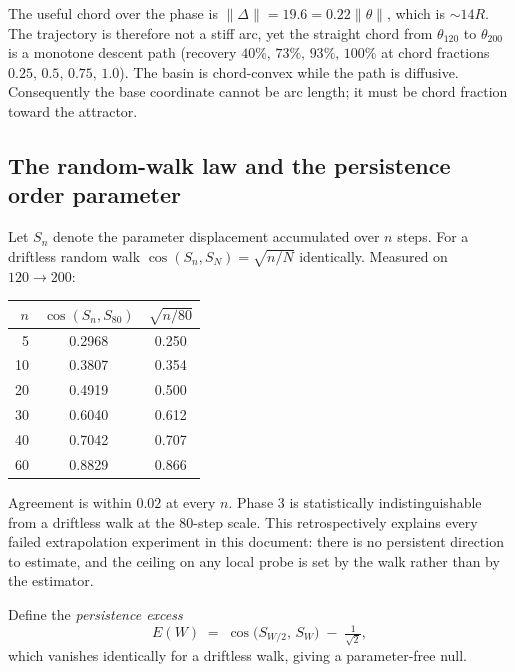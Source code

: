 \begin{observation}
The useful chord over the phase is $\|\Delta\| = 19.6 = 0.22\|\theta\|$,
which is $\sim 14 R$. The trajectory is therefore not a stiff arc, yet the
straight chord from $\theta_{120}$ to $\theta_{200}$ is a monotone descent
path (recovery $40\%,\,73\%,\,93\%,\,100\%$ at chord fractions
$0.25,\,0.5,\,0.75,\,1.0$). The basin is chord-convex while the path is
diffusive. Consequently the base coordinate cannot be arc length; it must be
chord fraction toward the attractor.
\end{observation}

\subsection{The random-walk law and the persistence order parameter}

Let $S_n$ denote the parameter displacement accumulated over $n$ steps. For a
driftless random walk $\cos(S_n,S_N) = \sqrt{n/N}$ identically. Measured on
$120\to200$:

\begin{center}
\begin{tabular}{rcc}
\toprule
$n$ & $\cos(S_n, S_{80})$ & $\sqrt{n/80}$ \\
\midrule
5  & 0.2968 & 0.250 \\
10 & 0.3807 & 0.354 \\
20 & 0.4919 & 0.500 \\
30 & 0.6040 & 0.612 \\
40 & 0.7042 & 0.707 \\
60 & 0.8829 & 0.866 \\
\bottomrule
\end{tabular}
\end{center}

Agreement is within $0.02$ at every $n$. Phase 3 is statistically
indistinguishable from a driftless walk at the $80$-step scale. This
retrospectively explains every failed extrapolation experiment in this
document: there is no persistent direction to estimate, and the ceiling on
any local probe is set by the walk rather than by the estimator.

Define the \emph{persistence excess}
\begin{equation}
  E(W) \;=\; \cos\!\big(S_{W/2},\,S_W\big) \;-\; \tfrac{1}{\sqrt{2}},
  \label{eq:persistence}
\end{equation}
which vanishes identically for a driftless walk, giving a parameter-free null.

